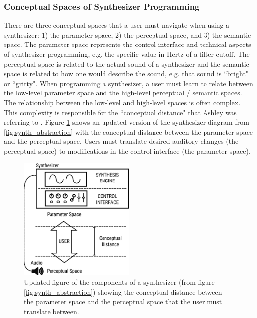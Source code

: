 \subsubsection{Conceptual Spaces of Synthesizer Programming}
There are three conceptual spaces that a user must navigate when using a synthesizer: 1) the parameter space, 2) the perceptual space, and 3) the semantic space. The parameter space represents the control interface and technical aspects of synthesizer programming, e.g. the specific value in Hertz of a filter cutoff. The perceptual space is related to the actual sound of a synthesizer and the semantic space is related to how one would describe the sound, e.g. that sound is ``bright" or ``gritty". When programming a synthesizer, a user must learn to relate between the low-level parameter space and the high-level perceptual / semantic spaces. The relationship between the low-level and high-level spaces is often complex. This complexity is responsible for the ``conceptual distance" that Ashley was referring to \cite{ashley1986knowledge}. Figure \ref{fig:synth_conceptual_dist} shows an updated version of the synthesizer diagram from \ref{fig:synth_abstraction} with the conceptual distance between the parameter space and the perceptual space. Users must translate desired auditory changes (the perceptual space) to modifications in the control interface (the parameter space).

\begin{figure}[ht]
    \centering
    \includegraphics[width=0.5\textwidth]{figures/background/synth_conceptual_dist.eps}
    \caption{Updated figure of the components of a synthesizer (from figure \ref{fig:synth_abstraction}) showing the conceptual distance between the parameter space and the perceptual space that the user must translate between.}
    \label{fig:synth_conceptual_dist}
\end{figure}

